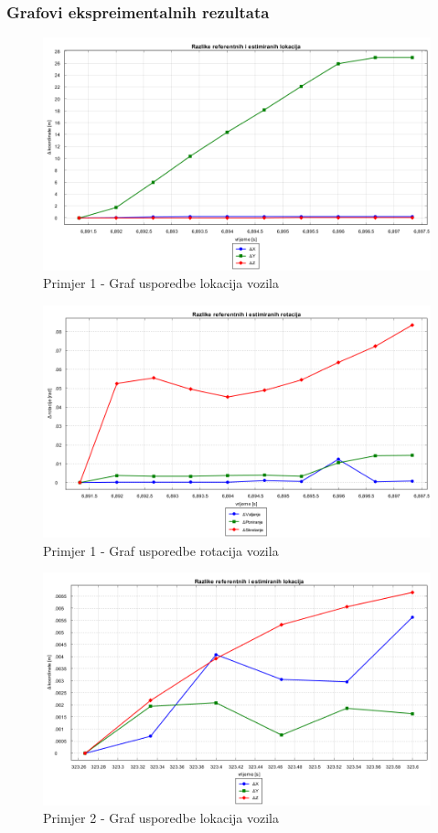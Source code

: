 \subsubsection{Grafovi ekspreimentalnih rezultata}
\begin{figure}[H]
  \includegraphics[scale=0.4]{images/imgs/1_zavoj_lokacije.png}
  \caption{Primjer 1 - Graf usporedbe lokacija vozila}
  \label{eval:primjer_1_lokacija}
\end{figure}
\begin{figure}[H]
  \includegraphics[scale=0.4]{images/imgs/1_zavoj_rotacije.png}
  \caption{Primjer 1 - Graf usporedbe rotacija vozila}
  \label{eval:primjer_1_rotacija}
\end{figure}
\begin{figure}[H]
  \includegraphics[scale=0.4]{images/imgs/2_ravno_lokacije.png}
  \caption{Primjer 2 - Graf usporedbe lokacija vozila}
  \label{eval:primjer_2_lokacija}
\end{figure}
